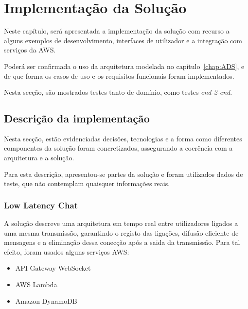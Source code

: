 % 
\chapter{Implementação da Solução} 
\label{chap:Impl} %

Neste capítulo, será apresentada a implementação da solução com recurso a alguns exemplos de desenvolvimento, interfaces de utilizador e a integração com serviços da \gls{AWS}.

Poderá ser confirmada o uso da arquitetura modelada no capítulo~\ref{chap:ADS}, e de que forma os casos de uso e os requisitos funcionais foram implementados.

Nesta secção, são mostrados testes tanto de domínio, como testes \textit{end-2-end}.


\section{Descrição da implementação} 
\label{sec:desc} %

Nesta secção, estão evidenciadas decisões, tecnologias e a forma como diferentes componentes da solução foram concretizados, assegurando a coerência com a arquitetura e a solução. 

Para esta descrição, apresentou-se partes da solução e foram utilizados dados de teste, que não contemplam quaisquer informações reais.

\subsection{\textbf{Low Latency Chat}}

A solução descreve uma arquitetura em tempo real entre utilizadores ligados a uma mesma transmissão, garantindo o registo das ligações, difusão eficiente de mensagens e a eliminação dessa conecção após a saida da transmissão. Para tal efeito, foram usados alguns serviços AWS:

\begin{itemize}
    \item API Gateway WebSocket
    \item AWS Lambda
    \item Amazon DynamoDB
\end{itemize}

